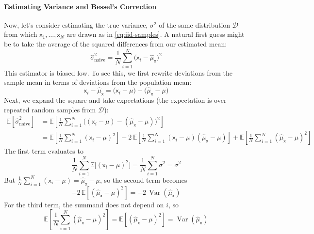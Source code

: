 \paragraph*{Estimating Variance and Bessel's Correction}
Now, let's consider estimating the true variance, $\sigma^2$ of the same distribution $\mathcal{D}$ from which $\mathsf{x}_1,\ldots,\mathsf{x}_N$ are drawn as in \autoref{eq:iid-samples}. A natural first guess might be to take the average of the squared differences from our estimated mean:
\begin{equation}
\hat{\sigma}^{2}_{\text{naive}} = \frac{1}{N}\sum_{i=1}^{N}\!\bigl(\mathsf{x}_i-\hat{\mu}_{\mathsf{x}}\bigr)^{2}
\end{equation}
This estimator is biased low. To see this, we first rewrite deviations from the sample mean in terms of deviations from the population mean:
\begin{equation}
    \mathsf{x}_i-\hat{\mu}_{\mathsf{x}} =\bigl(\mathsf{x}_i-\mu\bigr)-\bigl(\hat{\mu}_{\mathsf{x}}-\mu\bigr)
\end{equation}
Next, we expand the square and take expectations (the expectation is over repeated random samples from $\mathcal{D}$):
\begin{align}
    \mathbb{E}\!\left[\hat{\sigma}^{2}_{\text{naive}}\right]
    &=\mathbb{E}\!\left[\frac{1}{N}\sum_{i=1}^{N}\!\bigl((\mathsf{x}_i-\mu)-(\hat{\mu}_{\mathsf{x}}-\mu)\bigr)^{2}\right] \nonumber \\
    &=\mathbb{E}\!\left[\frac{1}{N}\sum_{i=1}^{N}(\mathsf{x}_i-\mu)^{2}\right] -2\,\mathbb{E}\!\left[\frac{1}{N}\sum_{i=1}^{N}(\mathsf{x}_i-\mu)(\hat{\mu}_{\mathsf{x}}-\mu)\right] +\mathbb{E}\!\left[\frac{1}{N}\sum_{i=1}^{N}(\hat{\mu}_{\mathsf{x}}-\mu)^{2}\right]
\end{align}
The first term evaluates to
\begin{equation}
    \frac{1}{N}\sum_{i=1}^{N}\mathbb{E}\!\big[(\mathsf{x}_i-\mu)^{2}\big]=\frac{1}{N}\sum_{i=1}^{N}\sigma^{2}
    =\sigma^{2}
\end{equation}
But $\frac{1}{N}\sum_{i=1}^{N}(\mathsf{x}_i-\mu)=\hat{\mu}_{\mathsf{x}}-\mu$, so the second term becomes
\begin{equation}
    -2\,\mathbb{E}\!\left[(\hat{\mu}_{\mathsf{x}}-\mu)^{2}\right]
    = -2\,\operatorname{Var}(\hat{\mu}_{\mathsf{x}})
\end{equation}
For the third term, the summand does not depend on $i$, so
\begin{equation}
    \mathbb{E}\!\left[\frac{1}{N}\sum_{i=1}^{N}(\hat{\mu}_{\mathsf{x}}-\mu)^{2}\right]
    =\mathbb{E}\!\left[(\hat{\mu}_{\mathsf{x}}-\mu)^{2}\right]
    =\operatorname{Var}(\hat{\mu}_{\mathsf{x}})
\end{equation}
